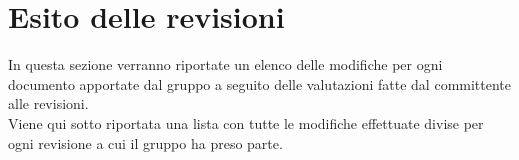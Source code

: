 %



\section{Esito delle revisioni}
In questa sezione verranno riportate un elenco delle modifiche per ogni documento apportate dal gruppo a seguito delle valutazioni fatte dal committente alle revisioni.\\
Viene qui sotto riportata una lista con tutte le modifiche effettuate divise per ogni revisione a cui il gruppo ha preso parte.


